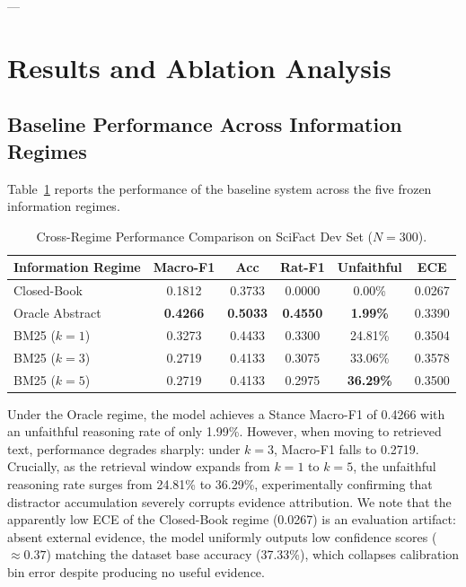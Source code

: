 \documentclass[10pt,journal,compsoc]{IEEEtran}
\begin{document}
---

\section{Results and Ablation Analysis}

\subsection{Baseline Performance Across Information Regimes}
Table~\ref{tab:regime_comparison} reports the performance of the baseline system across the five frozen information regimes.

\begin{table}[h]
\centering
\caption{Cross-Regime Performance Comparison on SciFact Dev Set ($N=300$).}
\label{tab:regime_comparison}
\begin{tabular}{lccccc}
\toprule
\textbf{Information Regime} & \textbf{Macro-F1} & \textbf{Acc} & \textbf{Rat-F1} & \textbf{Unfaithful} & \textbf{ECE} \\
\midrule
Closed-Book & 0.1812 & 0.3733 & 0.0000 & 0.00\% & 0.0267 \\
Oracle Abstract & \textbf{0.4266} & \textbf{0.5033} & \textbf{0.4550} & \textbf{1.99\%} & 0.3390 \\
BM25 ($k=1$) & 0.3273 & 0.4433 & 0.3300 & 24.81\% & 0.3504 \\
BM25 ($k=3$) & 0.2719 & 0.4133 & 0.3075 & 33.06\% & 0.3578 \\
BM25 ($k=5$) & 0.2719 & 0.4133 & 0.2975 & \textbf{36.29\%} & 0.3500 \\
\bottomrule
\end{tabular}
\end{table}

Under the Oracle regime, the model achieves a Stance Macro-F1 of 0.4266 with an unfaithful reasoning rate of only 1.99\%. However, when moving to retrieved text, performance degrades sharply: under $k=3$, Macro-F1 falls to 0.2719. Crucially, as the retrieval window expands from $k=1$ to $k=5$, the unfaithful reasoning rate surges from 24.81\% to 36.29\%, experimentally confirming that distractor accumulation severely corrupts evidence attribution. We note that the apparently low ECE of the Closed-Book regime (0.0267) is an evaluation artifact: absent external evidence, the model uniformly outputs low confidence scores ($\approx 0.37$) matching the dataset base accuracy (37.33\%), which collapses calibration bin error despite producing no useful evidence.
\end{document}
